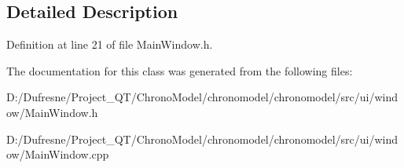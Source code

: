 \subsection{Detailed Description}


Definition at line 21 of file Main\-Window.\-h.



The documentation for this class was generated from the following files\-:\begin{DoxyCompactItemize}
\item 
D\-:/\-Dufresne/\-Project\-\_\-\-Q\-T/\-Chrono\-Model/chronomodel/chronomodel/src/ui/window/Main\-Window.\-h\item 
D\-:/\-Dufresne/\-Project\-\_\-\-Q\-T/\-Chrono\-Model/chronomodel/chronomodel/src/ui/window/Main\-Window.\-cpp\end{DoxyCompactItemize}
